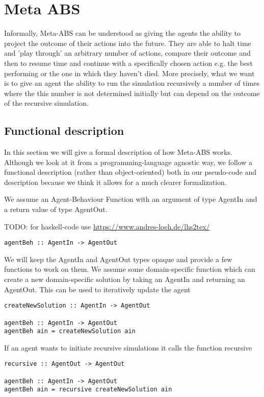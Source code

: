 \section{Meta ABS}
Informally, Meta-ABS can be understood as giving the agents the ability to project the outcome of their actions into the future. They are able to halt time and 'play through' an arbitrary number of actions, compare their outcome and then to resume time and continue with a specifically chosen action e.g. the best performing or the one in which they haven't died. 
More precisely, what we want is to give an agent the ability to run the simulation recursively a number of times where the this number is not determined initially but can depend on the outcome of the recursive simulation. 

\subsection{Functional description}
In this section we will give a formal description of how Meta-ABS works. Although we look at it from a programming-language agnostic way, we follow a functional description (rather than object-oriented) both in our pseudo-code and description because we think it allows for a much clearer formalization.

We assume an Agent-Behaviour Function with an argument of type AgentIn and a return value of type AgentOut.

TODO: for haskell-code use \url{https://www.andres-loeh.de/lhs2tex/}

\begin{lstlisting}[frame=single]
agentBeh :: AgentIn -> AgentOut
\end{lstlisting}

We will keep the AgentIn and AgentOut types opaque and provide a few functions to work on them. We assume some domain-specific function which can create a new domain-specific solution by taking an AgentIn and returning an AgentOut. This can be used to iteratively update the agent

\begin{lstlisting}[frame=single]
createNewSolution :: AgentIn -> AgentOut

agentBeh :: AgentIn -> AgentOut
agentBeh ain = createNewSolution ain
\end{lstlisting}

If an agent wants to initiate recursive simulations it calls the function recursive 

\begin{lstlisting}[frame=single]
recursive :: AgentOut -> AgentOut

agentBeh :: AgentIn -> AgentOut
agentBeh ain = recursive createNewSolution ain
\end{lstlisting}

